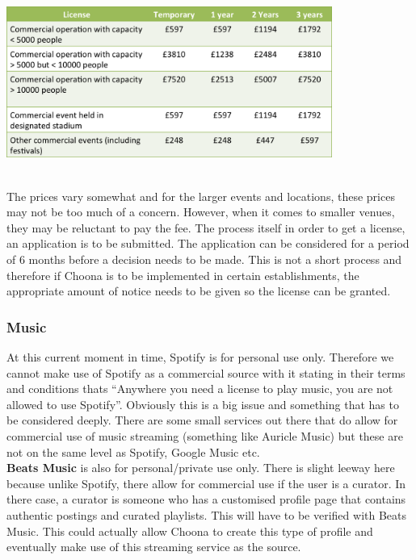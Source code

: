 \begin{minipage}{\linewidth}
\centering
\includegraphics[width=0.8\textwidth]{./img/table_license.png}
\label{fig:license_prices}
\end{minipage}\\

The prices vary somewhat and for the larger events and locations, these prices may not be too much of a concern.  However, when it comes to smaller venues, they may be reluctant to pay the fee.  The process itself in order to get a license, an application is to be submitted.  The application can be considered for a period of 6 months before a decision needs to be made.   This is not a short process and therefore if Choona is to be implemented in certain establishments, the appropriate amount of notice needs to be given so the license can be granted.  

\subsubsection{Music}
At this current moment in time, Spotify is for personal use only.  Therefore we cannot make use of Spotify as a commercial source with it stating in their terms and conditions thats ``Anywhere you need a license to play music, you are not allowed to use Spotify''.  Obviously this is a big issue and something that has to be considered deeply.  There are some small services out there that do allow for commercial use of music streaming (something like Auricle Music) but these are not on the same level as Spotify, Google Music etc.  \\
\textbf{Beats Music} is also for personal/private use only.  There is slight leeway here because unlike Spotify, there allow for commercial use if the user is a curator.  In there case, a curator is someone who has a customised profile page that contains authentic postings and curated playlists.  This will have to be verified with Beats Music.  This could actually allow Choona to create this type of profile and eventually make use of this streaming service as the source.  

